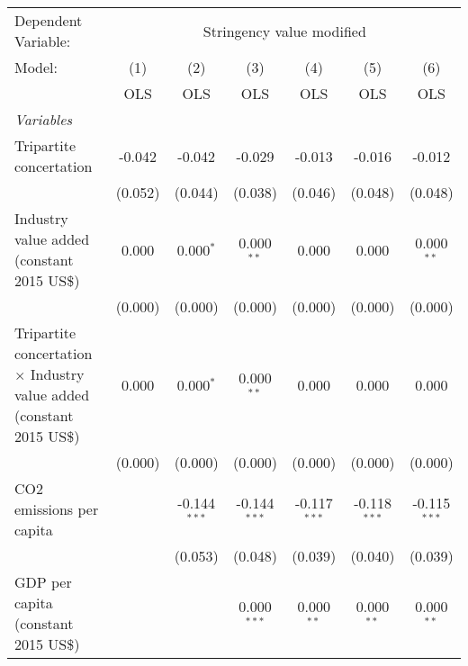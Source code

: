 
\begingroup
\centering
\begin{tabular}{lcccccc}
   \toprule
   Dependent Variable: & \multicolumn{6}{c}{Stringency value modified}\\
   Model:                                                                       & (1)     & (2)            & (3)            & (4)            & (5)            & (6)\\  
                                                                                &  OLS    & OLS            & OLS            & OLS            & OLS            & OLS\\  
   \midrule
   \emph{Variables}\\
   Tripartite concertation                                                      & -0.042  & -0.042         & -0.029         & -0.013         & -0.016         & -0.012\\   
                                                                                & (0.052) & (0.044)        & (0.038)        & (0.046)        & (0.048)        & (0.048)\\   
   Industry value added (constant 2015 US\$)                                    & 0.000   & 0.000$^{*}$    & 0.000$^{**}$   & 0.000          & 0.000          & 0.000$^{**}$\\   
                                                                                & (0.000) & (0.000)        & (0.000)        & (0.000)        & (0.000)        & (0.000)\\   
   Tripartite concertation $\times$ Industry value added (constant 2015 US\$)   & 0.000   & 0.000$^{*}$    & 0.000$^{**}$   & 0.000          & 0.000          & 0.000\\   
                                                                                & (0.000) & (0.000)        & (0.000)        & (0.000)        & (0.000)        & (0.000)\\   
   CO2 emissions per capita                                                     &         & -0.144$^{***}$ & -0.144$^{***}$ & -0.117$^{***}$ & -0.118$^{***}$ & -0.115$^{***}$\\   
                                                                                &         & (0.053)        & (0.048)        & (0.039)        & (0.040)        & (0.039)\\   
   GDP per capita (constant 2015 US\$)                                          &         &                & 0.000$^{***}$  & 0.000$^{**}$   & 0.000$^{**}$   & 0.000$^{**}$\\   

\end{tabular}
